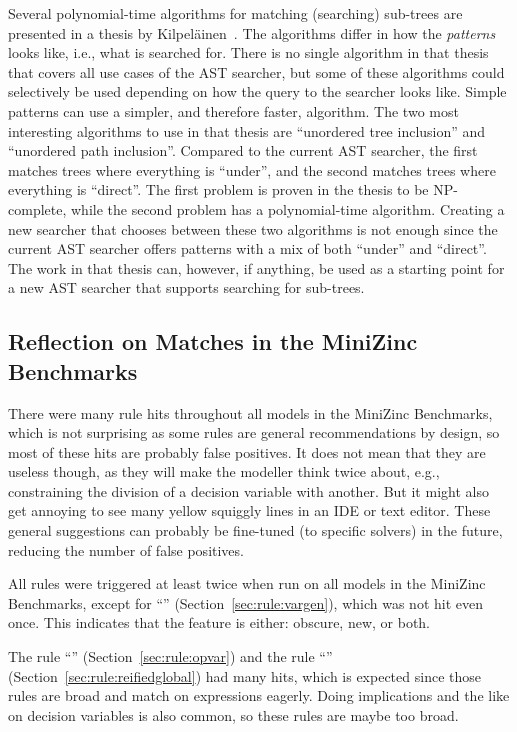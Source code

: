 \documentclass[a4paper,12pt]{article}
\newcommand{\ruleref}[1]{``\nameref{sec:rule:#1}'' (Section~\ref{sec:rule:#1})}
\begin{document}
Several polynomial-time algorithms for matching (searching) sub-trees are presented in
a thesis by Kilpeläinen~\cite{kilpelainen92}. %
The algorithms differ in how the \emph{patterns} looks like, i.e., what is searched for.
There is no single algorithm in that thesis that covers all use cases of the AST searcher,
but some of these algorithms could selectively be used depending on how the query to
the searcher looks like. Simple patterns can use a simpler, and therefore faster, algorithm.
The two most interesting algorithms to use in that thesis are ``unordered tree inclusion''
and ``unordered path inclusion''. Compared to the current AST searcher, the first matches
trees where everything is ``under'', and the second matches trees where everything is
``direct''. The first problem is proven in the thesis to be NP-complete, while the second problem has a
polynomial-time algorithm. Creating a new searcher that chooses between these two
algorithms is not enough since the current AST searcher offers patterns with a mix of
both ``under'' and ``direct''. The work in that thesis can, however, if anything, be used as a
starting point for a new AST searcher that supports searching for sub-trees.

\subsection{Reflection on Matches in the MiniZinc Benchmarks}\label{sec:discussion:refl}
There were many rule hits throughout all models in the MiniZinc Benchmarks, which is not
surprising as some rules are general recommendations by design, so most of these hits are
probably false positives. It does not mean that they are useless though, as they will make
the modeller think twice about, e.g., constraining the division of a decision variable with another. But it
might also get annoying to see many yellow squiggly lines in an IDE or text editor. These
general suggestions can probably be fine-tuned (to specific solvers) in the future, reducing
the number of false positives.

All rules were triggered at least twice when run on all models in the MiniZinc Benchmarks,
except for \ruleref{vargen}, which was not hit even once. This indicates that the feature
is either: obscure, new, or both.

The rule \ruleref{opvar} and the rule \ruleref{reifiedglobal} had many hits,
which is expected since those rules are broad and match on expressions eagerly.
Doing implications and the like on decision variables is also common, so these rules are maybe too broad.
\end{document}
